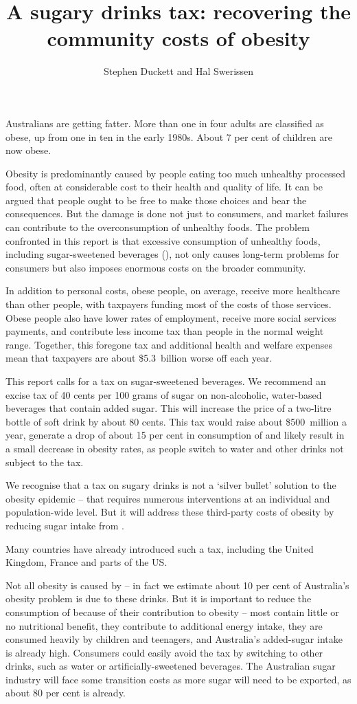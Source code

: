 \documentclass[embargoed]{grattan}
\title{A sugary drinks tax: recovering the community costs of obesity}
\author{Stephen Duckett and Hal Swerissen}
\begin{document}
\begin{overview}

Australians are getting fatter.
More than one in four adults are classified as obese, up from one in ten in the early 1980s. About 7 per cent of children are now obese.

Obesity is predominantly caused by people eating too much unhealthy processed food, often at considerable cost to their health and quality of life. It can be argued that people ought to be free to make those choices and bear the consequences. But the damage is done not just to consumers, and market failures can contribute to the overconsumption of unhealthy foods. The problem confronted in this report is that excessive consumption of unhealthy foods, including sugar-sweetened beverages (\SSBs{}), not only causes long-term problems for consumers but also imposes enormous costs on the broader community.

In addition to personal costs, obese people, on average, receive more healthcare than other people, with taxpayers funding most of the costs of those services.
Obese people also have lower rates of employment, receive more social services payments, and contribute less income tax than people in the normal weight range.
Together, this foregone tax and additional health and welfare expenses mean that taxpayers are about \$5.3~billion worse off each year. 

This report calls for a tax on sugar-sweetened beverages.
We recommend an excise tax of 40 cents per 100 grams of sugar on non-alcoholic, water-based beverages that contain added sugar.
This will increase the price of a two-litre bottle of soft drink by about 80 cents.
This tax would raise about \$500~million a year, generate a drop of about 15 per cent in consumption of \SSBs{} and likely result in a small decrease in obesity rates, as people switch to water and other drinks not subject to the tax. 

We recognise that a tax on sugary drinks is not a ‘silver bullet’ solution to the obesity epidemic – that requires numerous interventions at an individual and population-wide level.
But it will address these third-party costs of obesity by reducing sugar intake from \SSBs{}.

Many countries have already introduced such a tax, including the United Kingdom, France and parts of the US.

Not all obesity is caused by \SSBs{} – in fact we estimate about 10 per cent of Australia’s obesity problem is due to these drinks.
But it is important to reduce the consumption of \SSBs{} because of their contribution to obesity -- most contain little or no nutritional benefit, they contribute to additional energy intake,  they are consumed heavily by children and teenagers, and Australia’s added-sugar intake is already high.
Consumers could easily avoid the tax by switching to other drinks, such as water or artificially-sweetened beverages. The Australian sugar industry will face some transition costs as more sugar will need to be exported, as about 80 per cent is already. 


\end{overview}
\end{document}
